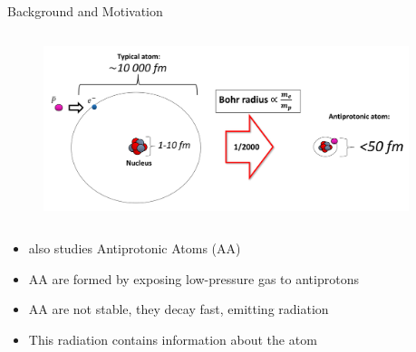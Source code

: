 \begin{columnframe}{Background and Motivation}
    \begin{column}{0.5\textwidth}
        \begin{figure}
            \centering
            \includegraphics[width=0.95\textwidth, frame]{images/antiprotonic_atom_diagram.png}
        \end{figure}
    \end{column}
    \begin{column}{0.5\textwidth}
        \begin{itemize}
            \item \aegis also studies Antiprotonic Atoms (AA)
            \item AA are formed by exposing low-pressure gas to antiprotons
            \item AA are not stable, they decay fast, emitting radiation
            \item This radiation contains information about the atom
        \end{itemize}
    \end{column}
\end{columnframe}

